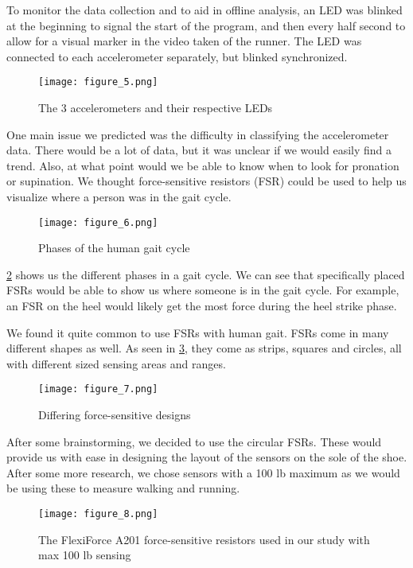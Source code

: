 To monitor the data collection and to aid in offline analysis, an LED was blinked at the beginning to signal the start of the program, and then every half second to allow for a visual marker in the video taken of the runner.
The LED was connected to each accelerometer separately, but blinked synchronized.\par
\begin{figure}
  \centering
  \texttt{[image: figure\_5.png]}
  \caption[Accelerometer LEDs]{The 3 accelerometers and their respective LEDs}
  \label{fig:x 3-leds}
\end{figure}
One main issue we predicted was the difficulty in classifying the accelerometer data.
There would be a lot of data, but it was unclear if we would easily find a trend.
Also, at what point would we be able to know when to look for pronation or supination.
We thought force-sensitive resistors (FSR) could be used to help us visualize where a person was in the gait cycle.\par
\begin{figure}
  \centering
  \texttt{[image: figure\_6.png]}
  \caption[Gait cycle]{Phases of the human gait cycle \parencite{tekscan-cycle}}
  \label{fig:x gait cycle}
\end{figure}
\ref{fig:x gait cycle} shows us the different phases in a gait cycle.
We can see that specifically placed FSRs would be able to show us where someone is in the gait cycle.
For example, an FSR on the heel would likely get the most force during the heel strike phase.\par
We found it quite common to use FSRs with human gait.
FSRs come in many different shapes as well.
As seen in \ref{fig:x fsr designs}, they come as strips, squares and circles, all with different sized sensing areas and ranges.\par
\begin{figure}
  \centering
  \texttt{[image: figure\_7.png]}
  \caption[FSR designs]{Differing force-sensitive designs \parencite{mouser}}
  \label{fig:x fsr designs}
\end{figure}
After some brainstorming, we decided to use the circular FSRs.
These would provide us with ease in designing the layout of the sensors on the sole of the shoe.
After some more research, we chose sensors with a 100 lb maximum as we would be using these to measure walking and running.\par
\begin{figure}
  \centering
  \texttt{[image: figure\_8.png]}
  \caption[FlexiForce A201]{The FlexiForce A201 force-sensitive resistors used in our study with max 100 lb sensing \parencite{tekscan-sensor}}
  \label{fig:x flexiforce}
\end{figure}
